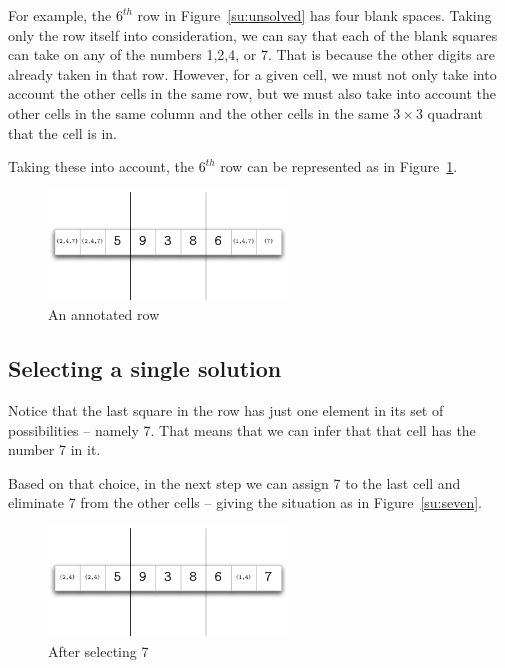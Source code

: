 For example, the $6^{th}$ row in Figure~\vref{su:unsolved} has four blank spaces. Taking only the row itself into consideration, we can say that each of the blank squares can take on any of the numbers 1,2,4, or 7. That is because the other digits are already taken in that row. However, for a given cell, we must not only take into account the other cells in the same row, but we must also take into account the other cells in the same column and the other cells in the same $3\times{}3$ quadrant that the cell is in.

Taking these into account, the $6^{th}$ row can be represented as in Figure~\ref{su:sixth}.

\begin{figure}[h]
\centering
\includegraphics[width=2.5in]{sixth}
\caption{\label{su:sixth}An annotated row}
\end{figure}

\subsection{Selecting a single solution}
Notice that the last square in the row has just one element in its set of possibilities -- namely 7. That means that we can infer that that cell has the number 7 in it.

Based on that choice, in the next step we can assign 7 to the last cell and eliminate 7 from the other cells -- giving the situation as in Figure~\vref{su:seven}.

\begin{figure}[h]
\centering
\includegraphics[width=2.5in]{seven}
\caption{\label{su:seven}After selecting 7}
\end{figure}

